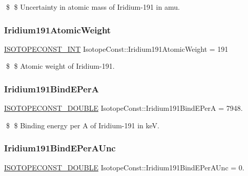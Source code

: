 \$ \$ Uncertainty in atomic mass of Iridium-\/191 in amu. \mbox{\label{group___isotope_const-_iridium-_ir191_ga0ca2dc01f22be45c900d346b69a9a057}} 
\subsubsection{\texorpdfstring{Iridium191\+Atomic\+Weight}{Iridium191AtomicWeight}}
{\footnotesize\ttfamily \mbox{\hyperlink{group___isotope_const-_macros_ga5f18360b3e99483a35c32d789e62621c}{I\+S\+O\+T\+O\+P\+E\+C\+O\+N\+S\+T\+\_\+\+I\+NT}} Isotope\+Const\+::\+Iridium191\+Atomic\+Weight = 191}

\$ \$ Atomic weight of Iridium-\/191. \mbox{\label{group___isotope_const-_iridium-_ir191_ga05b1a2e149039fdc80d2dcb1abcae6f0}} 
\subsubsection{\texorpdfstring{Iridium191\+Bind\+E\+PerA}{Iridium191BindEPerA}}
{\footnotesize\ttfamily \mbox{\hyperlink{group___isotope_const-_macros_ga8f45a7272ce02c0b4c65c44636ed719a}{I\+S\+O\+T\+O\+P\+E\+C\+O\+N\+S\+T\+\_\+\+D\+O\+U\+B\+LE}} Isotope\+Const\+::\+Iridium191\+Bind\+E\+PerA = 7948.}

\$ \$ Binding energy per A of Iridium-\/191 in keV. \mbox{\label{group___isotope_const-_iridium-_ir191_ga13c91d10465366b5f815a99bd952ba54}} 
\subsubsection{\texorpdfstring{Iridium191\+Bind\+E\+Per\+A\+Unc}{Iridium191BindEPerAUnc}}
{\footnotesize\ttfamily \mbox{\hyperlink{group___isotope_const-_macros_ga8f45a7272ce02c0b4c65c44636ed719a}{I\+S\+O\+T\+O\+P\+E\+C\+O\+N\+S\+T\+\_\+\+D\+O\+U\+B\+LE}} Isotope\+Const\+::\+Iridium191\+Bind\+E\+Per\+A\+Unc = 0.}

